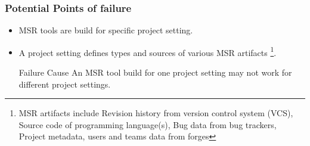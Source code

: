         \begin{frame}
            \frametitle{Potential Points of failure}
            \begin{itemize}
                \item MSR tools are build for specific project setting.
                \item A project setting defines types and sources of various MSR artifacts
                \footnote{
                        MSR artifacts include Revision history from version control system (VCS),
                        Source code of programming language(s), Bug data from bug trackers, Project metadata,
                        users and teams data from forges
                }.

            \begin{alertblock}{Failure Cause}
                An MSR tool build for one project setting may not work for different project settings.
            \end{alertblock}

            \end{itemize}
        \end{frame}


